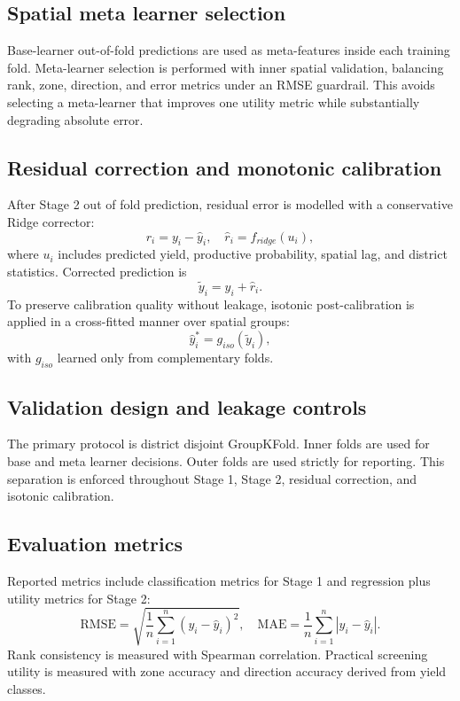 \documentclass[preprint,12pt]{elsarticle}
\begin{document}
\subsection{Spatial meta learner selection}
Base-learner out-of-fold predictions are used as meta-features inside each training fold. Meta-learner selection is performed with inner spatial validation, balancing rank, zone, direction, and error metrics under an RMSE guardrail. This avoids selecting a meta-learner that improves one utility metric while substantially degrading absolute error.

\subsection{Residual correction and monotonic calibration}
After Stage 2 out of fold prediction, residual error is modelled with a conservative Ridge corrector:
\begin{equation}
r_i=y_i-\hat{y}_i,\quad \hat{r}_i=f_{ridge}(u_i),
\end{equation}
where $u_i$ includes predicted yield, productive probability, spatial lag, and district statistics. Corrected prediction is
\begin{equation}
\tilde{y}_i=\hat{y}_i+\hat{r}_i.
\end{equation}
To preserve calibration quality without leakage, isotonic post-calibration is applied in a cross-fitted manner over spatial groups:
\begin{equation}
\hat{y}^{*}_i=g_{iso}(\tilde{y}_i),
\end{equation}
with $g_{iso}$ learned only from complementary folds.

\subsection{Validation design and leakage controls}
The primary protocol is district disjoint GroupKFold. Inner folds are used for base and meta learner decisions. Outer folds are used strictly for reporting. This separation is enforced throughout Stage 1, Stage 2, residual correction, and isotonic calibration.

\subsection{Evaluation metrics}
Reported metrics include classification metrics for Stage 1 and regression plus utility metrics for Stage 2:
\begin{equation}
\mathrm{RMSE}=\sqrt{\frac{1}{n}\sum_{i=1}^{n}(y_i-\hat{y}_i)^2},\quad
\mathrm{MAE}=\frac{1}{n}\sum_{i=1}^{n}|y_i-\hat{y}_i|.
\end{equation}
Rank consistency is measured with Spearman correlation. Practical screening utility is measured with zone accuracy and direction accuracy derived from yield classes.
\end{document}
